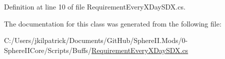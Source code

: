 Definition at line 10 of file Requirement\+Every\+X\+Day\+S\+D\+X.\+cs.



The documentation for this class was generated from the following file\+:\begin{DoxyCompactItemize}
\item 
C\+:/\+Users/jkilpatrick/\+Documents/\+Git\+Hub/\+Sphere\+I\+I.\+Mods/0-\/\+Sphere\+I\+I\+Core/\+Scripts/\+Buffs/\mbox{\hyperlink{_requirement_every_x_day_s_d_x_8cs}{Requirement\+Every\+X\+Day\+S\+D\+X.\+cs}}\end{DoxyCompactItemize}
